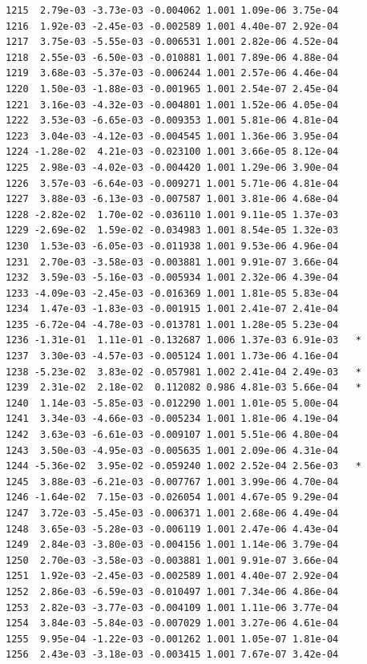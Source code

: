 \documentclass[
  letterpaper,
  DIV=11,
  numbers=noendperiod]{scrartcl}
\begin{document}
\begin{verbatim}
1215  2.79e-03 -3.73e-03 -0.004062 1.001 1.09e-06 3.75e-04    
1216  1.92e-03 -2.45e-03 -0.002589 1.001 4.40e-07 2.92e-04    
1217  3.75e-03 -5.55e-03 -0.006531 1.001 2.82e-06 4.52e-04    
1218  2.55e-03 -6.50e-03 -0.010881 1.001 7.89e-06 4.88e-04    
1219  3.68e-03 -5.37e-03 -0.006244 1.001 2.57e-06 4.46e-04    
1220  1.50e-03 -1.88e-03 -0.001965 1.001 2.54e-07 2.45e-04    
1221  3.16e-03 -4.32e-03 -0.004801 1.001 1.52e-06 4.05e-04    
1222  3.53e-03 -6.65e-03 -0.009353 1.001 5.81e-06 4.81e-04    
1223  3.04e-03 -4.12e-03 -0.004545 1.001 1.36e-06 3.95e-04    
1224 -1.28e-02  4.21e-03 -0.023100 1.001 3.66e-05 8.12e-04    
1225  2.98e-03 -4.02e-03 -0.004420 1.001 1.29e-06 3.90e-04    
1226  3.57e-03 -6.64e-03 -0.009271 1.001 5.71e-06 4.81e-04    
1227  3.88e-03 -6.13e-03 -0.007587 1.001 3.81e-06 4.68e-04    
1228 -2.82e-02  1.70e-02 -0.036110 1.001 9.11e-05 1.37e-03    
1229 -2.69e-02  1.59e-02 -0.034983 1.001 8.54e-05 1.32e-03    
1230  1.53e-03 -6.05e-03 -0.011938 1.001 9.53e-06 4.96e-04    
1231  2.70e-03 -3.58e-03 -0.003881 1.001 9.91e-07 3.66e-04    
1232  3.59e-03 -5.16e-03 -0.005934 1.001 2.32e-06 4.39e-04    
1233 -4.09e-03 -2.45e-03 -0.016369 1.001 1.81e-05 5.83e-04    
1234  1.47e-03 -1.83e-03 -0.001915 1.001 2.41e-07 2.41e-04    
1235 -6.72e-04 -4.78e-03 -0.013781 1.001 1.28e-05 5.23e-04    
1236 -1.31e-01  1.11e-01 -0.132687 1.006 1.37e-03 6.91e-03   *
1237  3.30e-03 -4.57e-03 -0.005124 1.001 1.73e-06 4.16e-04    
1238 -5.23e-02  3.83e-02 -0.057981 1.002 2.41e-04 2.49e-03   *
1239  2.31e-02  2.18e-02  0.112082 0.986 4.81e-03 5.66e-04   *
1240  1.14e-03 -5.85e-03 -0.012290 1.001 1.01e-05 5.00e-04    
1241  3.34e-03 -4.66e-03 -0.005234 1.001 1.81e-06 4.19e-04    
1242  3.63e-03 -6.61e-03 -0.009107 1.001 5.51e-06 4.80e-04    
1243  3.50e-03 -4.95e-03 -0.005635 1.001 2.09e-06 4.31e-04    
1244 -5.36e-02  3.95e-02 -0.059240 1.002 2.52e-04 2.56e-03   *
1245  3.88e-03 -6.21e-03 -0.007767 1.001 3.99e-06 4.70e-04    
1246 -1.64e-02  7.15e-03 -0.026054 1.001 4.67e-05 9.29e-04    
1247  3.72e-03 -5.45e-03 -0.006371 1.001 2.68e-06 4.49e-04    
1248  3.65e-03 -5.28e-03 -0.006119 1.001 2.47e-06 4.43e-04    
1249  2.84e-03 -3.80e-03 -0.004156 1.001 1.14e-06 3.79e-04    
1250  2.70e-03 -3.58e-03 -0.003881 1.001 9.91e-07 3.66e-04    
1251  1.92e-03 -2.45e-03 -0.002589 1.001 4.40e-07 2.92e-04    
1252  2.86e-03 -6.59e-03 -0.010497 1.001 7.34e-06 4.86e-04    
1253  2.82e-03 -3.77e-03 -0.004109 1.001 1.11e-06 3.77e-04    
1254  3.84e-03 -5.84e-03 -0.007029 1.001 3.27e-06 4.61e-04    
1255  9.95e-04 -1.22e-03 -0.001262 1.001 1.05e-07 1.81e-04    
1256  2.43e-03 -3.18e-03 -0.003415 1.001 7.67e-07 3.42e-04    

\end{verbatim}
\end{document}
